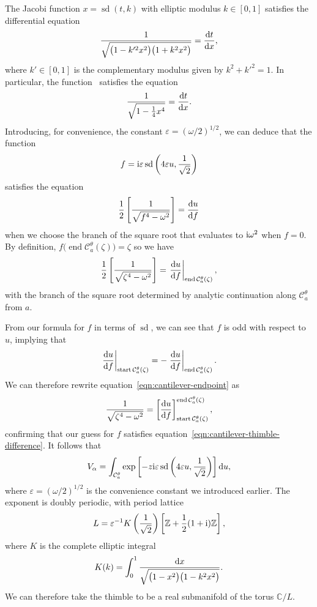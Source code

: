 \documentclass[10pt,a4paper]{amsart}
\newcommand{\Z}{\mathbb{Z}}
\newcommand{\C}{\mathbb{C}}
\numberwithin{equation}{section}
\begin{document}
The Jacobi function
$x = \operatorname{sd}(t, k)$
with elliptic modulus $k \in [0, 1]$ satisfies the differential equation~\cite[equation~(22.13.5)]{dlmf}
\[ \frac{1}{\sqrt{\bigl(1 - k'^2 x^2\bigr)\bigl(1 + k^2 x^2\bigr)}} = \frac{{\rm d}t}{{\rm d}x}, \]
where $k' \in [0, 1]$ is the complementary modulus given by $k^2 + k'^2 = 1$. In particular, the function~
satisfies the equation
\[
 \frac{1}{\sqrt{1 - \frac{1}{4} x^4}} = \frac{{\rm d}t}{{\rm d}x}.
 \]
Introducing, for convenience, the constant $\varepsilon = (\omega/2)^{1/2}$, we can deduce that the function
\[ f = {\rm i}\varepsilon \operatorname{sd}\left(4\varepsilon u, \frac{1}{\sqrt{2}}\right) \]
satisfies the equation
\[ \frac{1}{2} \left[ \frac{1}{\sqrt{f^4 - \omega^2}} \right] = \frac{{\rm d}u}{{\rm d}f} \]
when we choose the branch of the square root that evaluates to ${\rm i}\omega^2$ when $f = 0$. By definition, $f\bigl(\operatorname{end} \mathcal{C}_a^\theta(\zeta)\bigr) = \zeta$
so we have
\begin{equation}\label{eqn:cantilever-endpoint}
\frac{1}{2}\left[\frac{1}{\sqrt{\zeta^4 - \omega^2}}\right] = \left.\frac{{\rm d}u}{{\rm d}f}\right|_{\operatorname{end} \mathcal{C}_a^\theta(\zeta)},
\end{equation}
with the branch of the square root determined by analytic continuation along $\mathcal{C}_a^\theta$ from $a$.

From our formula for $f$ in terms of $\operatorname{sd}$, we can see that $f$ is odd with respect to $u$, implying that
\[ \left.\frac{{\rm d}u}{{\rm d}f}\right|_{\operatorname{start} \mathcal{C}_a^\theta(\zeta)} = -\left.\frac{{\rm d}u}{{\rm d}f}\right|_{\operatorname{end} \mathcal{C}_a^\theta(\zeta)}. \]
We can therefore rewrite equation~\eqref{eqn:cantilever-endpoint} as
\[ \frac{1}{\sqrt{\zeta^4-\omega^2}} = \left[\frac{{\rm d}u}{{\rm d}f}\right]_{\operatorname{start} \mathcal{C}_a^\theta(\zeta)}^{\operatorname{end} \mathcal{C}_a^\theta(\zeta)}, \]
confirming that our guess for $f$ satisfies equation~\eqref{eqn:cantilever-thimble-difference}. It follows that
\[ V_\alpha = \int_{\mathcal{C}_a^\theta} \exp\left[-z {\rm i}\varepsilon \operatorname{sd}\left(4\varepsilon u, \frac{1}{\sqrt{2}}\right) \right] {\rm d}u, \]
where $\varepsilon = (\omega/2)^{1/2}$ is the convenience constant we introduced earlier. The exponent is doubly periodic, with period lattice~\cite[Table~22.4.1]{dlmf}
\[ L = \varepsilon^{-1} K\left(\frac{1}{\sqrt{2}}\right)\left[\Z + \frac{1}{2}(1 + {\rm i}) \Z\right], \]
where $K$ is the complete elliptic integral~\cite[formula~(19.2.8)]{dlmf}
\[ K(k) = \int_0^1 \frac{{\rm d}x}{\sqrt{\bigl(1 - x^2\bigr)\bigl(1 - k^2 x^2\bigr)}}. \]
We can therefore take the thimble to be a real submanifold of the torus $\C / L$.
\end{document}
